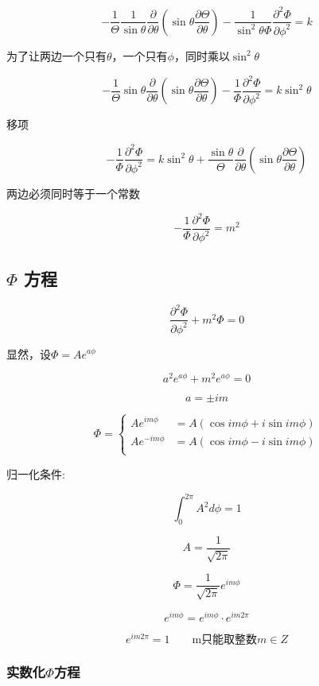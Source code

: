 \[
    - \frac{1}{\Theta} \frac{1}{ \sin \theta} \frac{\partial}{\partial \theta} \left( \sin \theta \frac{\partial \Theta}{\partial \theta} \right) - \frac{1}{ \sin ^2 \theta \Phi} \frac{\partial ^2 \Phi}{\partial \phi ^2} = k
\]

为了让两边一个只有$\theta$，一个只有$\phi$，同时乘以$\sin ^2   \theta$

\[
    - \frac{1}{\Theta}  \sin \theta \frac{\partial}{\partial \theta} \left( \sin \theta \frac{\partial \Theta}{\partial \theta} \right) - \frac{1}{\Phi} \frac{\partial ^2 \Phi}{\partial \phi ^2} = k \sin ^2 \theta
\]

移项

\[
    -\frac{1}{\Phi} \frac{\partial ^2 \Phi}{\partial \phi ^2} = k \sin ^2 \theta  + \frac{\sin \theta}{\Theta}   \frac{\partial}{\partial \theta} \left( \sin \theta \frac{\partial \Theta}{\partial \theta} \right)
\]

两边必须同时等于一个常数 

\[
     - \frac{1}{\Phi} \frac{\partial ^2 \Phi}{\partial \phi ^2} = m^2
\]

\subsection{$\Phi$ 方程}

\[
    \frac{\partial ^2 \Phi}{\partial \phi ^2} + m^2 \Phi  = 0
\]

显然，设$\Phi = A e^{a \phi}$ 

\[
    a^2 e^{a \phi} + m^2 e^{a \phi} = 0
\]

\[
    a = \pm im  
\]

\[
    \Phi = \begin{cases}
        Ae^{im\phi} & = A( \cos im\phi + i \sin im \phi)  \\
        Ae^{-im\phi} & =  A( \cos im\phi - i \sin im \phi) \\
    \end{cases}  
\]

归一化条件:


\[
    \int_0^{2\pi} A^2 d\phi = 1 
\] 

\[
    A = \frac{1}{\sqrt{2\pi}}  
\]

\[
    \Phi = \frac{1}{\sqrt{2\pi}} e ^{im\phi}  
\]

\[
    e^{im\phi} = e^{im\phi} \cdot e^{im2\pi}  
\]

\[
    e^{im 2\pi} = 1  \qquad \mbox{m只能取整数} m \in Z
\]


\subsubsection{实数化$\Phi$方程}

